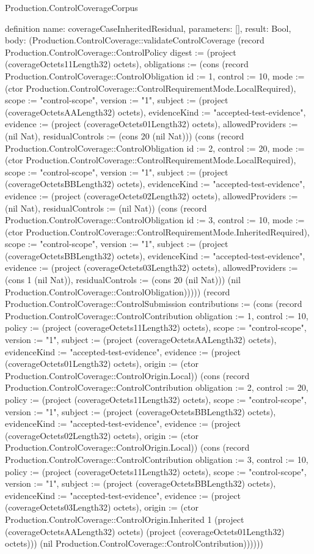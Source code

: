 \begin{lexlean}{Production.ControlCoverageCorpus}
\begin{semanticmodule}
definition{
  name: coverageCaseInheritedResidual,
  parameters: [],
  result: Bool,
  body: (Production.ControlCoverage::validateControlCoverage (record Production.ControlCoverage::ControlPolicy {digest := (project (coverageOctets11Length32) octets), obligations := (cons (record Production.ControlCoverage::ControlObligation {id := 1, control := 10, mode := (ctor Production.ControlCoverage::ControlRequirementMode.LocalRequired), scope := "control-scope", version := "1", subject := (project (coverageOctetsAALength32) octets), evidenceKind := "accepted-test-evidence", evidence := (project (coverageOctets01Length32) octets), allowedProviders := (nil Nat), residualControls := (cons 20 (nil Nat))}) (cons (record Production.ControlCoverage::ControlObligation {id := 2, control := 20, mode := (ctor Production.ControlCoverage::ControlRequirementMode.LocalRequired), scope := "control-scope", version := "1", subject := (project (coverageOctetsBBLength32) octets), evidenceKind := "accepted-test-evidence", evidence := (project (coverageOctets02Length32) octets), allowedProviders := (nil Nat), residualControls := (nil Nat)}) (cons (record Production.ControlCoverage::ControlObligation {id := 3, control := 10, mode := (ctor Production.ControlCoverage::ControlRequirementMode.InheritedRequired), scope := "control-scope", version := "1", subject := (project (coverageOctetsBBLength32) octets), evidenceKind := "accepted-test-evidence", evidence := (project (coverageOctets03Length32) octets), allowedProviders := (cons 1 (nil Nat)), residualControls := (cons 20 (nil Nat))}) (nil Production.ControlCoverage::ControlObligation))))}) (record Production.ControlCoverage::ControlSubmission {contributions := (cons (record Production.ControlCoverage::ControlContribution {obligation := 1, control := 10, policy := (project (coverageOctets11Length32) octets), scope := "control-scope", version := "1", subject := (project (coverageOctetsAALength32) octets), evidenceKind := "accepted-test-evidence", evidence := (project (coverageOctets01Length32) octets), origin := (ctor Production.ControlCoverage::ControlOrigin.Local)}) (cons (record Production.ControlCoverage::ControlContribution {obligation := 2, control := 20, policy := (project (coverageOctets11Length32) octets), scope := "control-scope", version := "1", subject := (project (coverageOctetsBBLength32) octets), evidenceKind := "accepted-test-evidence", evidence := (project (coverageOctets02Length32) octets), origin := (ctor Production.ControlCoverage::ControlOrigin.Local)}) (cons (record Production.ControlCoverage::ControlContribution {obligation := 3, control := 10, policy := (project (coverageOctets11Length32) octets), scope := "control-scope", version := "1", subject := (project (coverageOctetsBBLength32) octets), evidenceKind := "accepted-test-evidence", evidence := (project (coverageOctets03Length32) octets), origin := (ctor Production.ControlCoverage::ControlOrigin.Inherited 1 (project (coverageOctetsAALength32) octets) (project (coverageOctets01Length32) octets))}) (nil Production.ControlCoverage::ControlContribution))))}))
}


\end{semanticmodule}
\end{lexlean}
